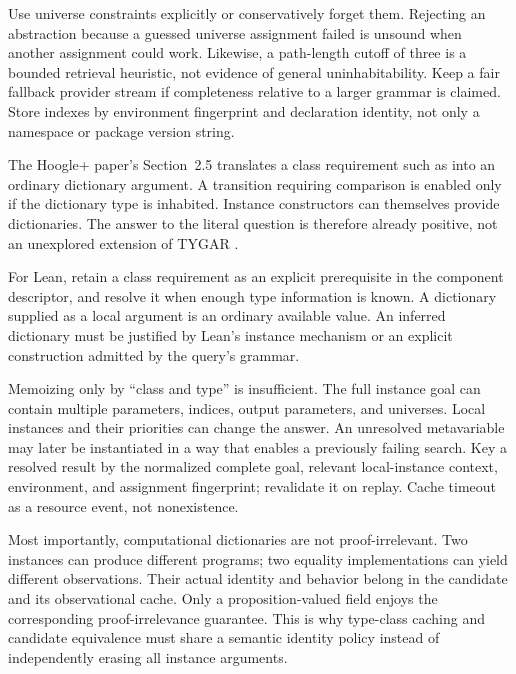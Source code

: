 Use universe constraints explicitly or conservatively forget them. Rejecting
an abstraction because a guessed universe assignment failed is unsound when
another assignment could work. Likewise, a path-length cutoff of three is a
bounded retrieval heuristic, not evidence of general uninhabitability. Keep a
fair fallback provider stream if completeness relative to a larger grammar
is claimed. Store indexes by environment fingerprint and declaration identity,
not only a namespace or package version string.


The Hoogle+ paper's Section~2.5 translates a class requirement such as
 into an ordinary dictionary argument. A transition requiring
comparison is enabled only if the dictionary type is inhabited. Instance
constructors can themselves provide dictionaries. The answer to the literal
question is therefore already positive, not an unexplored extension of
TYGAR \cite{hoogleplus}.

For Lean, retain a class requirement as an explicit prerequisite in the
component descriptor, and resolve it when enough type information is known.
A dictionary supplied as a local argument is an ordinary available value.
An inferred dictionary must be justified by Lean's instance mechanism or an
explicit construction admitted by the query's grammar.

Memoizing only by ``class and type'' is insufficient. The full instance goal
can contain multiple parameters, indices, output parameters, and universes.
Local instances and their priorities can change the answer. An unresolved
metavariable may later be instantiated in a way that enables a previously
failing search. Key a resolved result by the normalized complete goal,
relevant local-instance context, environment, and assignment fingerprint;
revalidate it on replay. Cache timeout as a resource event, not nonexistence.

Most importantly, computational dictionaries are not proof-irrelevant.
Two  instances can produce different programs; two equality
implementations can yield different observations. Their actual identity and
behavior belong in the candidate and its observational cache. Only a
proposition-valued field enjoys the corresponding proof-irrelevance guarantee.
This is why type-class caching and candidate equivalence must share a semantic
identity policy instead of independently erasing all instance arguments.

